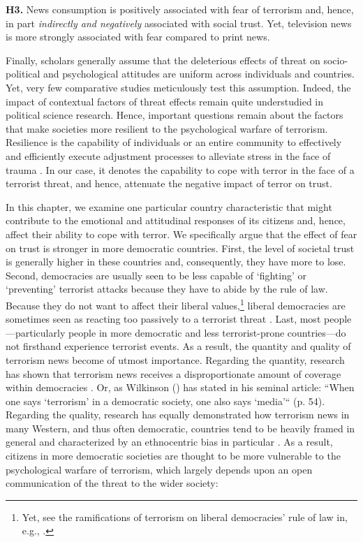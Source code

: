 \vspace{5mm}
\noindent\textbf{H3.} News consumption is positively associated with fear of terrorism and, hence, in part
\textit{indirectly and negatively} associated with social trust. Yet, television news is more strongly
associated with fear compared to print news.
\vspace{5mm}


Finally, scholars generally assume that the deleterious effects of threat on socio-political and psychological attitudes are uniform across individuals and countries. Yet, very few comparative studies meticulously test this assumption. Indeed, the impact of contextual factors of threat effects remain quite understudied in political science research. Hence, important questions remain about the factors that make societies more resilient to the psychological warfare of terrorism. Resilience is the capability of individuals or an entire community to effectively and efficiently execute adjustment processes to alleviate stress in the face of trauma \citep{Pfefferbaum2008}. In our case, it denotes the capability to cope with terror in the face of a terrorist threat, and hence, attenuate the negative impact of terror on trust. 


In this chapter, we examine one particular country characteristic that might contribute to the emotional and attitudinal responses of its citizens and, hence, affect their ability to cope with terror. We specifically argue that the effect of fear on trust is stronger in more democratic countries. First, the level of societal trust is generally higher in these countries \citep{Uslaner2000} and, consequently, they have more to lose. Second, democracies are usually seen to be less capable of `fighting' or `preventing' terrorist attacks because they have to abide by the rule of law. Because they do not want to affect their liberal values,\footnote{Yet, see the ramifications of terrorism on liberal democracies' rule of law in, e.g., \cite{Kundnani2014}.} liberal democracies are sometimes seen as reacting too passively to a terrorist threat \citep{Wilkinson1986}. Last, most people---particularly people in more democratic and less terrorist-prone countries---do not firsthand experience terrorist events. As a result, the quantity and quality of terrorism news become of utmost importance. Regarding the quantity, research has shown that terrorism news receives a disproportionate amount of coverage within democracies \citep{Iyengar1991}. Or, as Wilkinson (\citeyear{Wilkinson1997a}) has stated in his seminal article: ``When one says ‘terrorism’ in a democratic society, one also says ‘media’`` (p. 54). Regarding the quality, research has equally demonstrated how terrorism news in many Western, and thus often democratic, countries tend to be heavily framed in general \citep[e.g., `war on terror' frame;][]{Entman2003} and characterized by an ethnocentric bias in particular \citep{Powell2011}. As a result, citizens in more democratic societies are thought to be more vulnerable to the psychological warfare of terrorism, which largely depends upon an open communication of the threat to the wider society:


